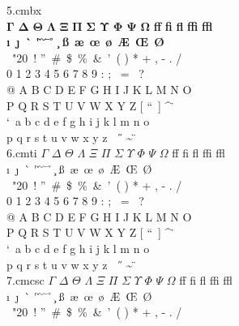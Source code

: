 \documentclass{article}
\begin{document}
5.cmbx\\
\noindent $\mathbf{\Gamma}$ $\mathbf{\Delta}$ $\mathbf{\Theta}$ $\mathbf{\Lambda}$ $\mathbf{\Xi}$ $\mathbf{\Pi}$ $\mathbf{\Sigma}$ $\mathbf{\Upsilon}$ $\mathbf{\Phi}$ $\mathbf{\Psi}$ $\mathbf{\Omega}$ \textbf{ff} \textbf{fi} \textbf{fl} \textbf{ffi} \textbf{ffl}\\
\textbf{\i}\ \textbf{\j}\ \textbf{\`{}} \textbf{\'{}} \textbf{\v{}} \textbf{\u{}} \textbf{\={}} \textbf{\r{}} \textbf{\c{}} \textbf{\ss}\ \textbf{\ae}\ \textbf{\oe}\ \textbf{\o}\ \textbf{\AE}\ \textbf{\OE}\ \textbf{\O}\\\
\selectfont\char"20\ ! \textquotedblright\ \#\ \$\ \%\ \&\ \textquoteright\ ( ) * + , - . /\\
0 1 2 3 4 5 6 7 8 9 : ; \textexclamdown\ = \textquestiondown\ ?\\
@ A B C D E F G H I J K L M N O\\
P Q R S T U V W X Y Z [ \textquotedblleft\ ] \^{} \.{} \\
\textquoteleft\ a b c d e f g h i j k l m n o\\
p q r s t u v w x y z \textendash\ \textemdash\ \H{} \~{} \"{}\\
6.cmti
\noindent $\Gamma$ $\Delta$ $\Theta$ $\Lambda$ $\Xi$ $\Pi$ $\Sigma$ $\Upsilon$ $\Phi$ $\Psi$ $\Omega$ ff fi fl ffi ffl\\
\i\ \j\ \`{} \'{} \v{} \u{} \={} \r{} \c{} \ss\ \ae\ \oe\ \o\ \AE\ \OE\ \O\\\
\fontfamily{cmr}\fontencoding{OT1}\selectfont\char"20\ ! \textquotedblright\ \#\ \$\ \%\ \&\ \textquoteright\ ( ) * + , - . /\\
0 1 2 3 4 5 6 7 8 9 : ; \textexclamdown\ = \textquestiondown\ ?\\
@ A B C D E F G H I J K L M N O\\
P Q R S T U V W X Y Z [ \textquotedblleft\ ] \^{} \.{} \\
\textquoteleft\ a b c d e f g h i j k l m n o\\
p q r s t u v w x y z \textendash\ \textemdash\ \H{} \~{} \"{}\\
7.cmcsc
\noindent $\Gamma$ $\Delta$ $\Theta$ $\Lambda$ $\Xi$ $\Pi$ $\Sigma$ $\Upsilon$ $\Phi$ $\Psi$ $\Omega$ ff fi fl ffi ffl\\
\i\ \j\ \`{} \'{} \v{} \u{} \={} \r{} \c{} \ss\ \ae\ \oe\ \o\ \AE\ \OE\ \O\\\
\selectfont\char"20\ ! \textquotedblright\ \#\ \$\ \%\ \&\ \textquoteright\ ( ) * + , - . /\\
\end{document}
